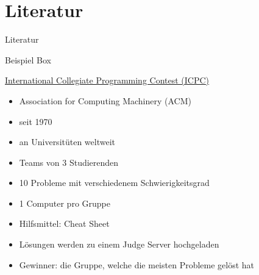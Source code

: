 \documentclass[aspectratio=169,xcolor=dvipsnames, t]{beamer}
\begin{document}
	
	\section{Literatur}
	\begin{frame}[allowframebreaks]{Literatur}
		\tiny
		
	\end{frame}
	
	
	\begin{frame}{Beispiel Box}
		\begin{block}{\href{https://icpc.global/}{International Collegiate Programming Contest (ICPC)}}
			\begin{itemize}
				\item Association for Computing Machinery (ACM)
				\item seit 1970
				\item an Universit\"uten weltweit
			\end{itemize}
		\end{block}
		\begin{itemize}
			\item Teams von 3 Studierenden
			\item 10 Probleme mit verschiedenem Schwierigkeitsgrad
			\item 1 Computer pro Gruppe
			\item Hilfsmittel: \glqq Cheat Sheet\grqq
			\item L\"osungen werden zu einem Judge Server hochgeladen
			\item Gewinner: die Gruppe, welche die meisten Probleme gel\"ost hat
		\end{itemize}
		
	\end{frame}
	
\end{document}
